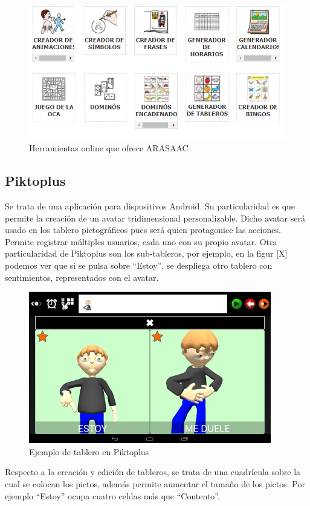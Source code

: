 \begin{figure}[h!]
	\centering
	\includegraphics[width=0.7\linewidth]{Imagenes/Bitmap/Tableros ARASAAC}
	\caption[Tableros web ARASAAC]{Herramientas online que ofrece ARASAAC}
	\label{fig:tableros-arasaac}
\end{figure}


\subsection{Piktoplus}
Se trata de una aplicación para dispositivos Android. Su particularidad es que permite la creación de un avatar tridimensional personalizable. Dicho avatar será usado en los tablero pictográficos pues será quien protagonice las acciones. Permite registrar múltiples usuarios, cada uno con su propio avatar. Otra particularidad de Piktoplus son los sub-tableros, por ejemplo, en la figur [X] podemos ver que si se pulsa sobre “Estoy”, se despliega otro tablero con sentimientos, representados con el avatar.

\begin{figure}[h!]
	\centering
	\includegraphics[width=0.7\linewidth]{Imagenes/Bitmap/Piktoplus1}
	\caption[Pictoplus tablero]{Ejemplo de tablero en Piktoplus}
	\label{fig:piktoplus1}
\end{figure}



Respecto a la creación y edición de tableros, se trata de una cuadrícula sobre la cual se colocan los pictos, además permite aumentar el tamaño de los pictos. Por ejemplo “Estoy” ocupa cuatro celdas más que “Contento”.

